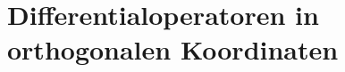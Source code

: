 %
%
%
%
\chapter{Differentialoperatoren in orthogonalen Koordinaten\label{chapter:diffortho}}
\begin{refsection}





\printbibliography[heading=subbibliography]
\end{refsection}


